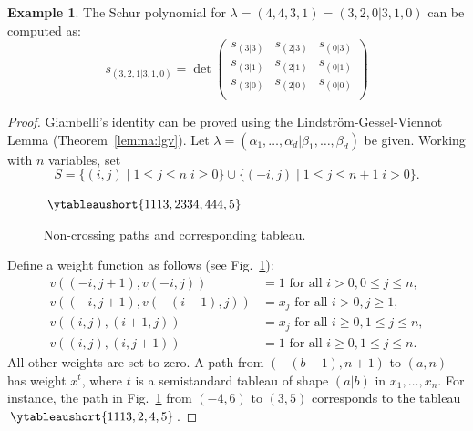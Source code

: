 \documentclass[11pt]{amsproc}
\theoremstyle{definition}
\theoremstyle{example}
\newtheorem{example}[theorem]{Example}
\begin{document}
\begin{example}
  The Schur polynomial for $\lambda=(4,4,3,1)=(3,2,0|3,1,0)$ can be computed as:
  \begin{displaymath}
    s_{(3,2,1|3,1,0)} = \det
    \begin{pmatrix}
      s_{(3|3)} & s_{(2|3)} & s_{(0|3)}\\
      s_{(3|1)} & s_{(2|1)} & s_{(0|1)}\\
      s_{(3|0)} & s_{(2|0)} & s_{(0|0)}\\
    \end{pmatrix}
  \end{displaymath}
\end{example}
\begin{proof}
  Giambelli's identity can be proved using the Lindstr\"om-Gessel-Viennot Lemma (Theorem~\ref{lemma:lgv}).
  Let $\lambda=(\alpha_1,\dotsc,\alpha_d|\beta_1,\dotsc,\beta_d)$ be given.
  Working with $n$ variables, set
  \begin{displaymath}
    S = \{(i,j)\mid 1\leq j \leq n\; i\geq 0\} \cup \{(-i,j)\mid 1\leq j\leq n+1\; i>0\}.
  \end{displaymath}
  \begin{figure}[h]
    \centering
    \hspace{1cm}$\ytableaushort{1113,2334,444,5}$
    \caption{Non-crossing paths and corresponding tableau.}
    \label{fig:giambelli}
  \end{figure}
  Define a weight function as follows (see Fig.~\ref{fig:giambelli}):
  \begin{align*}
    v((-i,j+1), v(-i,j)) & = 1 \text{ for all } i> 0, 0 \leq j \leq n,\\
    v((-i,j+1), v(-(i-1),j)) & = x_j \text{ for all } i>0, j\geq 1,\\
    v((i,j), (i+1,j)) & = x_j \text{ for all } i\geq 0, 1\leq j\leq n,\\
    v((i,j),(i,j+1)) & = 1 \text{ for all } i\geq 0, 1\leq j \leq n.
  \end{align*}
  All other weights are set to zero.
  A path from $(-(b-1),n+1)$ to $(a,n)$ has weight $x^t$, where $t$ is a semistandard tableau of shape $(a|b)$ in $x_1,\dotsc,x_n$.
  For instance, the path in Fig.~\ref{fig:giambelli} from $(-4,6)$ to $(3,5)$ corresponds to the tableau $\ytableaushort{1113,2,4,5}$.


\end{proof}
\end{document}

